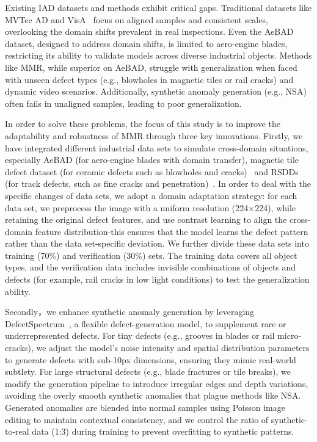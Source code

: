 Existing IAD datasets and methods exhibit critical gaps. 
Traditional datasets like MVTec AD and VisA~\cite{MVTec-1,MVTec-2,VisA} focus on aligned samples and consistent scales, overlooking the domain shifts prevalent in real inspections. 
Even the AeBAD dataset, designed to address domain shifts, is limited to aero-engine blades, restricting its ability to validate models across diverse industrial objects. 
Methods like MMR, while superior on AeBAD, struggle with generalization when faced with unseen defect types (e.g., blowholes in magnetic tiles or rail cracks) and dynamic video scenarios. 
Additionally, synthetic anomaly generation (e.g., NSA) often fails in unaligned samples, leading to poor generalization.

In order to solve these problems, the focus of this study is to improve the adaptability and robustness of MMR through three key innovations. 
Firstly, we have integrated different industrial data sets to simulate cross-domain situations, especially AeBAD (for aero-engine blades with domain transfer), magnetic tile defect dataset (for ceramic defects such as blowholes and cracks)~\cite{MTD-dataset} and RSDDs (for track defects, such as fine cracks and penetration)~\cite{RSDDs}. 
In order to deal with the specific changes of data sets, we adopt a domain adaptation strategy: for each data set, we preprocess the image with a uniform resolution (224×224), while retaining the original defect features, and use contrast learning to align the cross-domain feature distribution-this ensures that the model learns the defect pattern rather than the data set-specific deviation. 
We further divide these data sets into training (70\%) and verification (30\%) sets. The training data covers all object types, and the verification data includes invisible combinations of objects and defects (for example, rail cracks in low light conditions) to test the generalization ability.

Secondly，we enhance synthetic anomaly generation by leveraging DefectSpectrum~\cite{DefectSpectrum}, a flexible defect-generation model, to supplement rare or underrepresented defects. 
For tiny defects (e.g., grooves in blades or rail micro-cracks), we adjust the model’s noise intensity and spatial distribution parameters to generate defects with sub-10px dimensions, 
ensuring they mimic real-world subtlety. For large structural defects (e.g., blade fractures or tile breaks), we modify the generation pipeline to introduce irregular edges and depth variations, avoiding the overly smooth synthetic anomalies that plague methods like NSA. 
Generated anomalies are blended into normal samples using Poisson image editing to maintain contextual consistency, and we control the ratio of synthetic-to-real data (1:3) during training to prevent overfitting to synthetic patterns.

